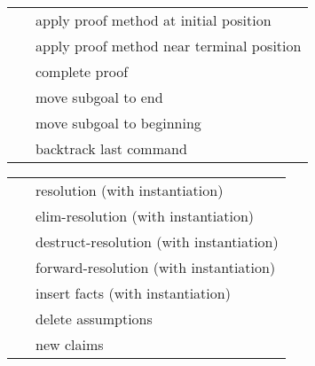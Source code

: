 \begin{isabellebody}
\begin{isamarkuptext}
\end{isamarkuptext}%
\isamarkuptrue%
%
\isamarkuptrue%
%
\isamarkuptrue%
%
\begin{isamarkuptext}%
\begin{tabular}{ll}
    \hyperlink{command.apply}{\mbox{\isa{\isacommand{apply}}}}~\isa{m} & apply proof method at initial position \\
    \hyperlink{command.apply_end}{\mbox{\isa{\isacommand{apply{\isacharunderscore}end}}}}~\isa{m} & apply proof method near terminal position \\
    \hyperlink{command.done}{\mbox{\isa{\isacommand{done}}}} & complete proof \\
    \hyperlink{command.defer}{\mbox{\isa{\isacommand{defer}}}}~\isa{n} & move subgoal to end \\
    \hyperlink{command.prefer}{\mbox{\isa{\isacommand{prefer}}}}~\isa{n} & move subgoal to beginning \\
    \hyperlink{command.back}{\mbox{\isa{\isacommand{back}}}} & backtrack last command \\
  \end{tabular}%
\end{isamarkuptext}%
\isamarkuptrue%
%
\isamarkuptrue%
%
\begin{isamarkuptext}%
\begin{tabular}{ll}
    \hyperlink{method.rule_tac}{\mbox{\isa{rule{\isacharunderscore}tac}}}~\isa{insts} & resolution (with instantiation) \\
    \hyperlink{method.erule_tac}{\mbox{\isa{erule{\isacharunderscore}tac}}}~\isa{insts} & elim-resolution (with instantiation) \\
    \hyperlink{method.drule_tac}{\mbox{\isa{drule{\isacharunderscore}tac}}}~\isa{insts} & destruct-resolution (with instantiation) \\
    \hyperlink{method.frule_tac}{\mbox{\isa{frule{\isacharunderscore}tac}}}~\isa{insts} & forward-resolution (with instantiation) \\
    \hyperlink{method.cut_tac}{\mbox{\isa{cut{\isacharunderscore}tac}}}~\isa{insts} & insert facts (with instantiation) \\
    \hyperlink{method.thin_tac}{\mbox{\isa{thin{\isacharunderscore}tac}}}~\isa{{\isasymphi}} & delete assumptions \\
    \hyperlink{method.subgoal_tac}{\mbox{\isa{subgoal{\isacharunderscore}tac}}}~\isa{{\isasymphi}} & new claims \\

\end{tabular}
\end{isamarkuptext}
\end{isabellebody}
